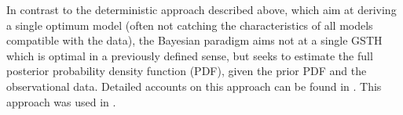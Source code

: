 \documentclass[cp]{copernicus}
\begin{document}
In contrast to the deterministic approach described above, which aim at deriving a single optimum 
model (often not catching the characteristics of all models compatible with the data), the Bayesian 
paradigm \cite[see, e.g.][] {Gelman2013a} aims not at a single GSTH which is optimal in a previously 
defined sense, but seeks to estimate the full posterior probability density function (PDF), given 
the prior PDF and the observational data. Detailed accounts on this approach can be found in 
\citep{Mosegaard1995a, Mosegaard2002a, Tarantola2005a}. This approach was used in 
\cite[][amongst others]{Kukkonen2011a, Kukkonen2011b, Kukkonen2015a, Rath2019a}. 
% 
%  
% 
\end{document}
